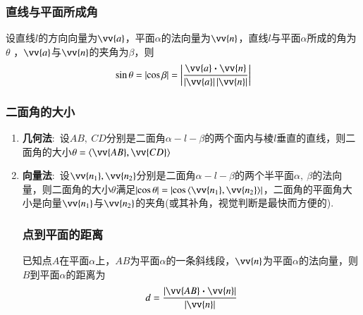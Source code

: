 \documentclass{BHCexam}
\newcommand{\tbf}[1]{\item \textbf{#1}:\ }
\begin{document}
\subsubsection{直线与平面所成角}
设直线$l$的方向向量为$\vv{a}$，平面$\alpha$的法向量为$\vv{n}$，直线$l$与平面$\alpha$所成的角为$ \theta $
，$\vv{a}$与$\vv{n}$的夹角为$\beta$，则\[\sin\theta=\left|\cos\beta\right|=\left|\dfrac{\vv{a}\bm{\cdot}\vv{n}}{\left|\vv{a}\right|\left|\vv{n}\right|} \right| \]
\subsubsection{二面角的大小}
\begin{enumerate}
	\tbf{几何法}设$ AB,\ CD $分别是二面角$ \alpha-l-\beta$的两个面内与棱$ l $垂直的直线，则二面角的大小$ \theta=\left< \vv{AB},\vv{CD}\right> $
	\tbf{向量法}设$ \vv{n_1},\vv{n_2} $分别是二面角$ \alpha-l-\beta $的两个半平面$ \alpha,\ \beta $的法向量，则二面角的大小$ \theta $满足$ \abs{\cos\theta}=\abs{\cos\left< \vv{n_1},\vv{n_2}\right>} $，二面角的平面角大小是向量$ \vv{n_1} $与$ \vv{n_2} $的夹角(或其补角，视觉判断是最快而方便的).
	\subsubsection{点到平面的距离}
已知点$ A $在平面$ \alpha $上，$ AB $为平面$ \alpha $的一条斜线段，$ \vv{n} $为平面$ \alpha $的法向量，则$ B $到平面$ \alpha $的距离为\[ d=\dfrac{\abs{\vv{AB}\bm{\cdot}\vv{n}}}{\abs{\vv{n}}} \]	
\end{enumerate}
\end{document}
